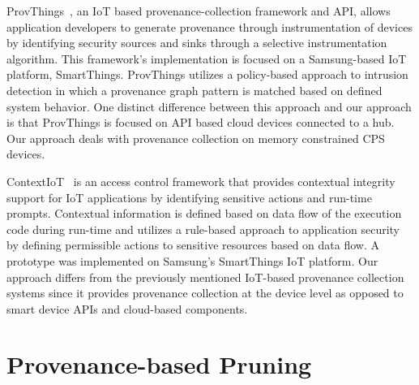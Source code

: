 ProvThings~\cite{Wang2017FearAL}, an IoT based provenance-collection framework and API, allows application developers to generate provenance through instrumentation of devices by identifying security sources and sinks through a selective instrumentation algorithm. This framework's implementation is focused on a Samsung-based IoT platform, SmartThings. ProvThings utilizes a policy-based approach to intrusion detection in which a provenance graph pattern is matched based on defined system behavior. One distinct difference between this approach and our approach is that ProvThings is focused on API based cloud devices connected to a hub. Our approach deals with provenance collection on memory constrained CPS devices.

ContextIoT~\cite{jia2017contexiot} is an access control framework that provides contextual integrity support for IoT applications by identifying sensitive actions and run-time prompts. Contextual information is defined based on data flow of the execution code during run-time and utilizes a rule-based approach to application security by defining permissible actions to sensitive resources based on data flow. A prototype was implemented on Samsung's SmartThings IoT platform.  Our approach differs from the previously mentioned IoT-based provenance collection systems since it provides provenance collection at the device level as opposed to smart device APIs and cloud-based components.



\section{Provenance-based Pruning}

